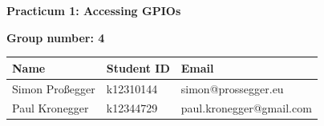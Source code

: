 \documentclass[11pt,a4paper]{article}
\begin{document}
\begin{center}
	{\LARGE \bfseries Practicum 1: Accessing GPIOs}
\end{center}

\vspace{0.5cm}
\textbf{Group number: 4}

\begin{table}[h]
	\centering
	\begin{tabularx}{\textwidth}{|X|X|X|}
		\hline
		\centering \textbf{Name} & \centering \textbf{Student ID} & \centering \textbf{Email} \tabularnewline \hline
		Simon Proßegger          & k12310144                      & simon@prossegger.eu \tabularnewline \hline
		Paul Kronegger           & k12344729                      & paul.kronegger@gmail.com \tabularnewline \hline
	\end{tabularx}
\end{table}


\newpage

\newpage

\newpage

\newpage

\newpage

\end{document}
